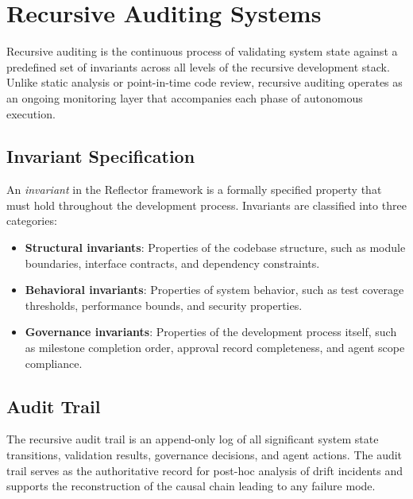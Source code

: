\section{Recursive Auditing Systems}
\label{sec:recursive-auditing}

%

Recursive auditing is the continuous process of validating system state against a
predefined set of invariants across all levels of the recursive development stack.
Unlike static analysis or point-in-time code review, recursive auditing operates
as an ongoing monitoring layer that accompanies each phase of autonomous execution.

\subsection{Invariant Specification}

An \textit{invariant} in the Reflector framework is a formally specified property
that must hold throughout the development process. Invariants are classified into
three categories:

\begin{itemize}
  \item \textbf{Structural invariants}: Properties of the codebase structure, such as
    module boundaries, interface contracts, and dependency constraints.
  \item \textbf{Behavioral invariants}: Properties of system behavior, such as test
    coverage thresholds, performance bounds, and security properties.
  \item \textbf{Governance invariants}: Properties of the development process itself,
    such as milestone completion order, approval record completeness, and agent scope
    compliance.
\end{itemize}

\subsection{Audit Trail}

The recursive audit trail is an append-only log of all significant system state
transitions, validation results, governance decisions, and agent actions. The audit
trail serves as the authoritative record for post-hoc analysis of drift incidents
and supports the reconstruction of the causal chain leading to any failure mode.

